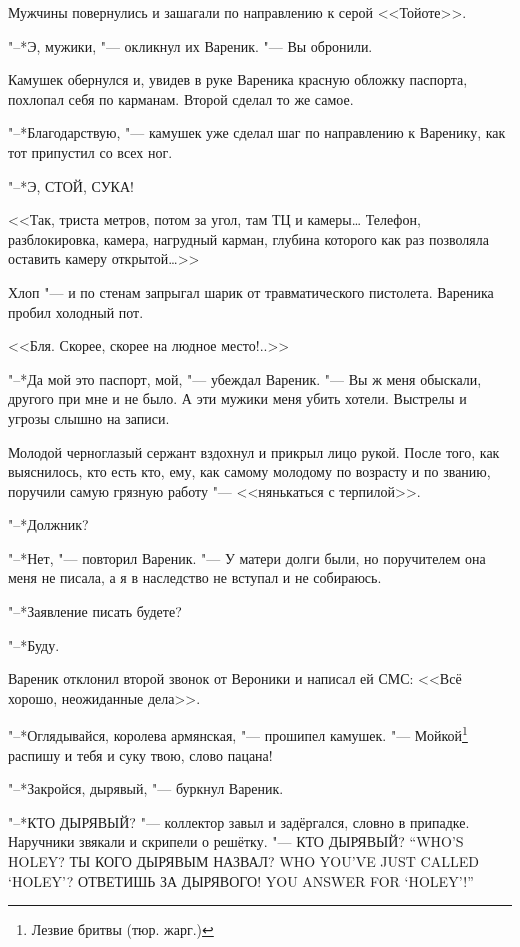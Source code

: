 Мужчины повернулись и зашагали по направлению к серой <<Тойоте>>.

"--*Э, мужики, "--- окликнул их Вареник.
"--- Вы обронили.

Камушек обернулся и, увидев в руке Вареника красную обложку паспорта, похлопал себя по карманам.
Второй сделал то же самое.

"--*Благодарствую, "--- камушек уже сделал шаг по направлению к Варенику, как тот припустил со всех ног.

"--*Э, СТОЙ, СУКА!

<<Так, триста метров, потом за угол, там ТЦ и камеры\ldots{}
Телефон, разблокировка, камера, нагрудный карман, глубина которого как раз позволяла оставить камеру открытой\ldots{}>>

Хлоп "--- и по стенам запрыгал шарик от травматического пистолета.
Вареника пробил холодный пот.

<<Бля.
Скорее, скорее на людное место!..>>

\asterism

"--*Да мой это паспорт, мой, "--- убеждал Вареник.
"--- Вы ж меня обыскали, другого при мне и не было.
А эти мужики меня убить хотели.
Выстрелы и угрозы слышно на записи.

Молодой черноглазый сержант вздохнул и прикрыл лицо рукой.
После того, как выяснилось, кто есть кто, ему, как самому молодому по возрасту и по званию, поручили самую грязную работу "--- <<нянькаться с терпилой>>.

"--*Должник?

"--*Нет, "--- повторил Вареник.
"--- У матери долги были, но поручителем она меня не писала, а я в наследство не вступал и не собираюсь.

"--*Заявление писать будете?

"--*Буду.

\asterism

Вареник отклонил второй звонок от Вероники и написал ей СМС:
<<Всё хорошо, неожиданные дела>>.

\textspace

"--*Оглядывайся, королева армянская, "--- прошипел камушек.
"--- Мойкой\footnote{Лезвие бритвы (тюр. жарг.)} распишу и тебя и суку твою, слово пацана!

"--*Закройся, дырявый, "--- буркнул Вареник.

"--*КТО ДЫРЯВЫЙ? "--- коллектор завыл и задёргался, словно в припадке.
Наручники звякали и скрипели о решётку.
{"--- КТО ДЫРЯВЫЙ?}
{``WHO'S HOLEY?}
{ТЫ КОГО ДЫРЯВЫМ НАЗВАЛ?}
{WHO YOU'VE JUST CALLED `HOLEY'?}
{ОТВЕТИШЬ ЗА ДЫРЯВОГО!}
{YOU ANSWER FOR `HOLEY'!''}

